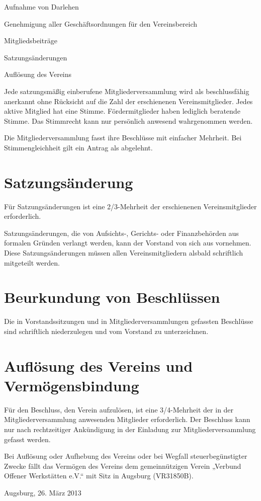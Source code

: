 \documentclass[a5paper, ngerman, 10pt]{scrreprt}
\begin{document}
\begin{compactenum}[(1)]
\begin{compactenum}[a.]
        \item Aufnahme von Darlehen 
        \item Genehmigung aller Geschäftsordnungen für den Vereinsbereich
        \item Mitgliedsbeiträge
        \item Satzungsänderungen
        \item Auflösung des Vereins
    \end{compactenum}
    \item Jede satzungsmäßig einberufene Mitgliederversammlung wird als
        beschlussfähig anerkannt ohne Rücksicht auf die Zahl der erschienenen
        Vereinsmitglieder. Jedes aktive Mitglied hat eine Stimme.
        Fördermitglieder haben lediglich beratende Stimme. Das Stimmrecht kann
        nur persönlich anwesend wahrgenommen werden.
    \item Die Mitgliederversammlung fasst ihre Beschlüsse mit einfacher
        Mehrheit.  Bei Stimmengleichheit gilt ein Antrag als abgelehnt.
\end{compactenum}


\section{Satzungsänderung}
\begin{compactenum}[(1)]
    \item Für Satzungsänderungen ist eine 2/3-Mehrheit der erschienenen
        Vereinsmitglieder erforderlich.
    \item Satzungsänderungen, die von Aufsichts-, Gerichts- oder Finanzbehörden
        aus formalen Gründen verlangt werden, kann der Vorstand von sich aus
        vornehmen. Diese Satzungsänderungen müssen allen Vereinsmitgliedern
        alsbald schriftlich mitgeteilt werden.
\end{compactenum}


\section{Beurkundung von Beschlüssen}
Die in Vorstandssitzungen und in Mitgliederversammlungen gefassten Beschlüsse
sind schriftlich niederzulegen und vom Vorstand zu unterzeichnen.


\section{Auflösung des Vereins und Vermögensbindung}
\begin{compactenum}[(1)]
    \item Für den Beschluss, den Verein aufzulösen, ist eine 3/4-Mehrheit der
        in der Mitgliederversammlung anwesenden Mitglieder erforderlich. Der
        Beschluss kann nur nach rechtzeitiger Ankündigung in der Einladung zur
        Mitgliederversammlung gefasst werden.
    \item Bei Auflösung oder Aufhebung des Vereins oder bei Wegfall
        steuerbegünstigter Zwecke fällt das Vermögen des Vereins dem
        gemeinnützigen Verein „Verbund Offener Werkstätten e.V.“ mit Sitz in
        Augsburg (VR31850B).
\end{compactenum}

\vspace{\fill}
Augsburg, 26. März 2013
\end{document}

